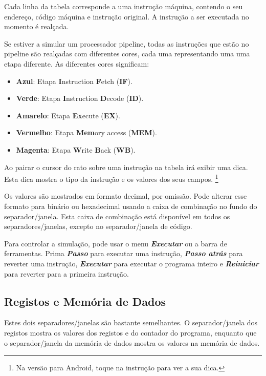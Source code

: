 \documentclass[11pt,a4paper,twoside,titlepage]{article}
\newcommand{\menupath}[1]{\textbf{\emph{#1}}}
\begin{document}
Cada linha da tabela corresponde a uma instrução máquina, contendo o seu
endereço, código máquina e instrução original.
A instrução a ser executada no momento é realçada.

Se estiver a simular um processador pipeline, todas as instruções que estão no
pipeline são realçadas com diferentes cores, cada uma representando uma uma etapa
diferente.
As diferentes cores significam:
\begin{itemize}
	\item \textbf{Azul}: Etapa \textbf{I}nstruction \textbf{F}etch (\textbf{IF}).
	\item \textbf{Verde}: Etapa \textbf{I}nstruction \textbf{D}ecode (\textbf{ID}).
	\item \textbf{Amarelo}: Etapa \textbf{Ex}ecute (\textbf{EX}).
	\item \textbf{Vermelho}: Etapa \textbf{Mem}ory access (\textbf{MEM}).
	\item \textbf{Magenta}: Etapa \textbf{W}rite \textbf{B}ack (\textbf{WB}).
\end{itemize}

Ao pairar o cursor do rato sobre uma instrução na tabela irá exibir uma dica.
Esta dica mostra o tipo da instrução e os valores dos seus campos. \footnote{Na
versão para Android, toque na instrução para ver a sua dica.}

Os valores são mostrados em formato decimal, por omissão.
Pode alterar esse formato para binário ou hexadecimal usando a caixa de 
combinação no fundo do separador/janela.
Esta caixa de combinação está disponível em todos os separadores/janelas, 
excepto no separador/janela de código.

Para controlar a simulação, pode usar o menu \menupath{Executar} ou a barra de
ferramentas. Prima \menupath{Passo} para executar uma instrução, 
\menupath{Passo atrás} para reverter uma instrução, \menupath{Executar} para
executar o programa inteiro e \menupath{Reiniciar} para reverter para a primeira
instrução.


\subsection{Registos e Memória de Dados}

Estes dois separadores/janelas são bastante semelhantes.
O separador/janela dos registos mostra os valores dos registos e do contador do
programa, enquanto que o separador/janela da memória de dados mostra os valores
na memória de dados.
\end{document}

